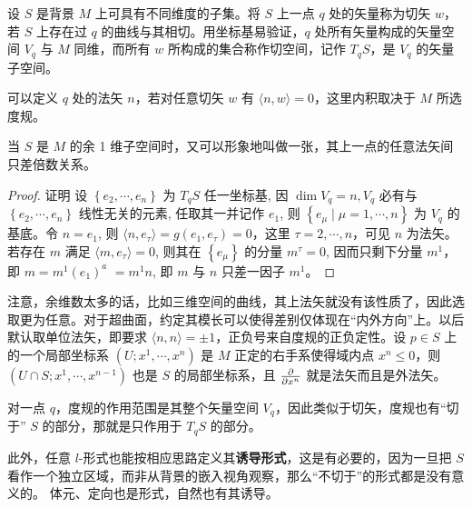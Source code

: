 \begin{definition}[切矢和法矢]
    设 $S$ 是背景 $M$ 上可具有不同维度的子集。将 $S$ 上一点 $q$ 处的矢量称为切矢 $w$，若 $S$ 上存在过 $q$ 的曲线与其相切。用坐标基易验证，$q$ 处所有矢量构成的矢量空间 $V_q$ 与 $M$ 同维，而所有 $w$ 所构成的集合称作切空间，记作 $T_q S$，是 $V_q$ 的矢量子空间。

    可以定义 $q$ 处的法矢 $n$，若对任意切矢 $w$ 有 $\langle n,w\rangle=0$，这里内积取决于 $M$ 所选度规。
\end{definition}
\begin{theorem}
    当 $S$ 是 $M$ 的余 1 维子空间时，又可以形象地叫做一张，其上一点的任意法矢间只差倍数关系。
\end{theorem}


\begin{proof}
    证明 设 $\left\{e_2, \cdots,e_n\right\}$ 为 $T_q S$ 任一坐标基, 因 $\dim V_q=n, V_q$ 必有与 $\left\{e_2,\cdots,e_n\right\}$ 线性无关的元素, 任取其一并记作 $e_1$, 则 $\left\{e_\mu\mid\mu=1, \cdots, n\right\}$ 为 $V_q$ 的基底。令 $n=e_1$, 则 $\langle n, e_\tau\rangle =g(e_1,e_\tau)=0$，这里 $\tau=2,\cdots,n$，可见 $n$ 为法矢。若存在 $m$ 满足 $\langle m,e_\tau\rangle=0$, 则其在 $\left\{e_\mu\right\}$ 的分量 $m^\tau=0$, 因而只剩下分量 $m^1$，即 $m=m^1\left(e_1\right)^a$ $=m^1n$, 即 $m$ 与 $n$ 只差一因子 $m^1$。
\end{proof}

注意，余维数太多的话，比如三维空间的曲线，其上法矢就没有该性质了，因此选取更为任意。对于超曲面，约定其模长可以使得差别仅体现在“内外方向”上。以后默认取单位法矢，即要求 $\langle n,n\rangle=\pm 1$，正负号来自度规的正负定性。设 $p\in S$ 上的一个局部坐标系 $(U;x^1,\cdots,x^{n})$ 是 $M$ 正定的右手系使得域内点 $x^n\leqslant 0$，则$(U\cap S;x^1,\cdots,x^{n-1})$ 也是 $S$ 的局部坐标系，且 $\pdv{x^n}$ 就是法矢而且是外法矢。

对一点 $q$，度规的作用范围是其整个矢量空间 $V_q$，因此类似于切矢，度规也有“切于” $S$ 的部分，那就是只作用于 $T_qS$ 的部分。


此外，任意 $l$-形式也能按相应思路定义其\textbf{诱导形式}，这是有必要的，因为一旦把 $S$ 看作一个独立区域，而非从背景的嵌入视角观察，那么“不切于”的形式都是没有意义的。
体元、定向也是形式，自然也有其诱导。


